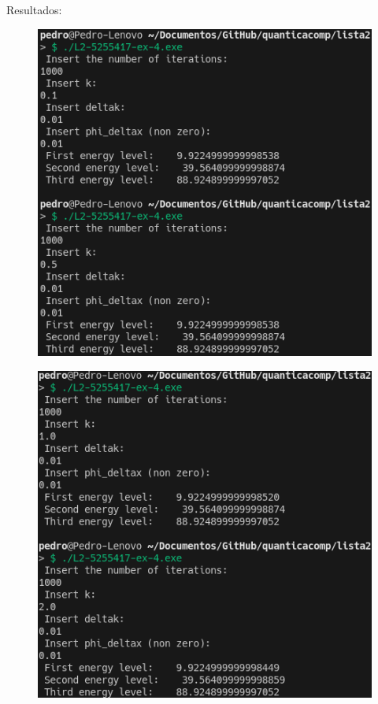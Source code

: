 \documentclass[12pt, a4paper]{article} %
\begin{document}
        Resultados:
        \begin{figure}[H]    
            \centering
            \includegraphics[scale=0.8]{../images/results-ex4-1.png}
            \caption{}
        \end{figure}
        \begin{figure}[H]    
            \centering
            \includegraphics[scale=0.8]{../images/results-ex4-2.png}
            \caption{}
        \end{figure}
\end{document}
